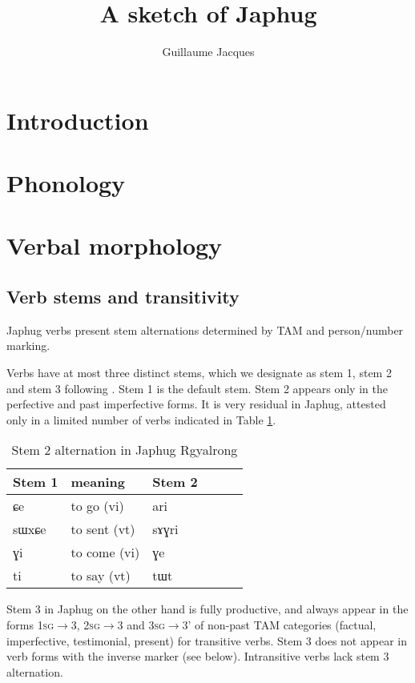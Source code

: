 \documentclass[oldfontcommands,oneside,a4paper,11pt]{article}
\newcommand{\ipa}[1]{{\phon #1}} %
\begin{document}
 

\title{A sketch of Japhug}
\author{Guillaume Jacques}
\maketitle

\section{Introduction}

\section{Phonology}
\citet{jacques07redupl}

\citet{japhug14ideophones}

\section{Verbal morphology}

\subsection{Verb stems and transitivity}

Japhug verbs present stem alternations determined by TAM and person/number marking. 

Verbs have at most three distinct stems, which we designate as stem 1, stem 2 and stem 3 following \citet{jackson00sidaba}. Stem 1 is the default stem. Stem 2 appears only in the perfective and past imperfective forms. It is very residual in Japhug, attested only in a limited number of verbs indicated in Table \ref{tab:stem2}.


 \begin{table} 
\caption{Stem 2 alternation in Japhug Rgyalrong} \label{tab:stem2} \centering
\begin{tabular}{llllll}
\toprule
Stem 1 & meaning &Stem 2 \\
\midrule
\ipa{ɕe}& to go (vi)&  \ipa{ari} \\
\ipa{sɯxɕe}& to sent (vt)  &\ipa{sɤɣri} \\
\ipa{ɣi}& to come (vi)  &\ipa{ɣe} \\
\ipa{ti}& to say (vt)  &\ipa{tɯt} \\
\bottomrule
\end{tabular}
\end{table}

Stem 3 in Japhug on the other hand is fully productive, and always appear in the forms \textsc{1sg}$\rightarrow$3, \textsc{2sg}$\rightarrow$3 and \textsc{3sg}$\rightarrow$3' of non-past TAM categories (factual, imperfective, testimonial, present) for transitive verbs. Stem 3 does not appear in verb forms with the inverse marker (see below). Intransitive verbs lack stem 3 alternation.
\end{document}
